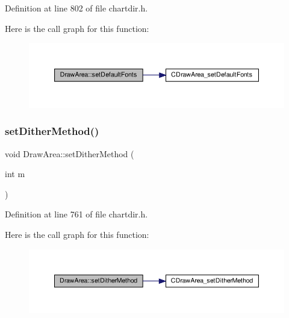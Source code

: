 Definition at line 802 of file chartdir.\+h.

Here is the call graph for this function\+:
\nopagebreak
\begin{figure}[H]
\begin{center}
\leavevmode
\includegraphics[width=350pt]{class_draw_area_a91476cda6d13c03459292d90c1ec1836_cgraph}
\end{center}
\end{figure}
\mbox{\label{class_draw_area_a662e9cac035d1e93b12ede254cc3be57}} 
\subsubsection{\texorpdfstring{set\+Dither\+Method()}{setDitherMethod()}}
{\footnotesize\ttfamily void Draw\+Area\+::set\+Dither\+Method (\begin{DoxyParamCaption}\item[{int}]{m }\end{DoxyParamCaption})\hspace{0.3cm}{\ttfamily [inline]}}



Definition at line 761 of file chartdir.\+h.

Here is the call graph for this function\+:
\nopagebreak
\begin{figure}[H]
\begin{center}
\leavevmode
\includegraphics[width=350pt]{class_draw_area_a662e9cac035d1e93b12ede254cc3be57_cgraph}
\end{center}
\end{figure}
\mbox{\label{class_draw_area_af3fd7897c1261ffb8f0a41b9a2e30e78}} 
